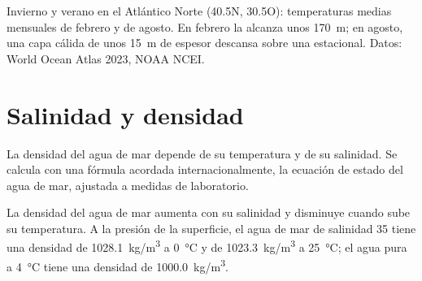 \begin{omfigure}

{\small Invierno y verano en el Atlántico Norte (40.5\textdegree N,
30.5\textdegree O): temperaturas medias mensuales de febrero y de agosto. En
febrero la  alcanza unos \qty{170}{m}; en agosto, una capa
cálida de unos \qty{15}{m} de espesor descansa sobre una 
estacional. Datos: World Ocean Atlas 2023, NOAA NCEI.}
\end{omfigure}

\section{Salinidad y densidad}

La densidad del agua de mar depende de su temperatura y de su salinidad. Se
calcula con una fórmula acordada internacionalmente, la ecuación de estado
del agua de mar, ajustada a medidas de laboratorio.

\begin{proposition}\label{prop:g10:layered-ocean:density}
La densidad del agua de mar aumenta con su salinidad y disminuye cuando sube
su temperatura. A la presión de la superficie, el agua de mar de salinidad 35
tiene una densidad de \qty{1028.1}{kg/m^3} a \qty{0}{\degreeCelsius} y de
\qty{1023.3}{kg/m^3} a \qty{25}{\degreeCelsius}; el agua pura a
\qty{4}{\degreeCelsius} tiene una densidad de \qty{1000.0}{kg/m^3}.
\end{proposition}

